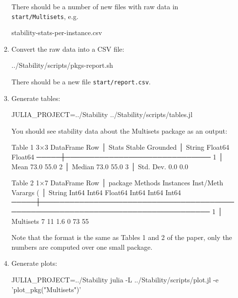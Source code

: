 \documentclass[
]{article}
\begin{document}
\begin{enumerate}
\begin{enumerate}
    There should be a number of new files with raw data in
    \texttt{start/Multisets},
    e.g.

\begin{verbnobox}[\small]
stability-stats-per-instance.csv
\end{verbnobox}

  \item
    Convert the raw data into a CSV file:

\begin{verbnobox}[\small]
../Stability/scripts/pkgs-report.sh
\end{verbnobox}

    There should be a new file \texttt{start/report.csv}.
  \item
    Generate tables:

\begin{verbnobox}[\small]
JULIA_PROJECT=../Stability ../Stability/scripts/tables.jl
\end{verbnobox}

    You should see stability data about the Multisets package as an
    output:

\begin{verbnobox}[\small]
 Table 1
 3×3 DataFrame
  Row │ Stats      Stable   Grounded 
      │ String     Float64  Float64  
 ─────┼──────────────────────────────
    1 │ Mean          73.0      55.0
    2 │ Median        73.0      55.0
    3 │ Std. Dev.      0.0       0.0
\end{verbnobox}

\begin{verbnobox}[\small]
 Table 2
 1×7 DataFrame
  Row │ package    Methods  Instances  Inst/Meth  Varargs (%
      │ String     Int64    Int64      Float64    Int64        Int64       Int64        
 ─────┼─────────────────────────────────────────────────────────────────────────────────
    1 │ Multisets        7         11        1.6            0          73            55
\end{verbnobox}

    Note that the format is the same as Tables 1 and 2 of the paper,
    only the numbers are computed over one small package.
  \item
    Generate plots:

\begin{verbnobox}[\small]
JULIA_PROJECT=../Stability julia -L ../Stability/scripts/plot.jl -e 'plot_pkg("Multisets")'
\end{verbnobox}


\end{enumerate}
\end{enumerate}
\end{document}
